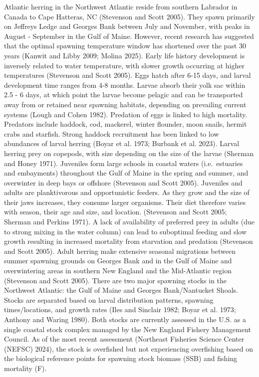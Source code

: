 \documentclass[
  letterpaper,
  DIV=11,
  numbers=noendperiod]{scrartcl}
\begin{document}
Atlantic herring in the Northwest Atlantic reside from southern Labrador
in Canada to Cape Hatteras, NC (Stevenson and Scott 2005). They spawn
primarily on Jeffreys Ledge and Georges Bank between July and November,
with peaks in August - September in the Gulf of Maine. However, recent
research has suggested that the optimal spawning temperature window has
shortened over the past 30 years (Kanwit and Libby 2009; Molina 2025).
Early life history development is inversely related to water
temperature, with slower growth occurring at higher temperatures
(Stevenson and Scott 2005). Eggs hatch after 6-15 days, and larval
development time ranges from 4-8 months. Larvae absorb their yolk sac
within 2.5 - 6 days, at which point the larvae become pelagic and can be
transported away from or retained near spawning habitats, depending on
prevailing current systems (Lough and Cohen 1982). Predation of eggs is
linked to high mortality. Predators include haddock, cod, mackerel,
winter flounder, moon snails, hermit crabs and starfish. Strong haddock
recruitment has been linked to low abundances of larval herring (Boyar
et al. 1973; Burbank et al. 2023). Larval herring prey on copepods, with
size depending on the size of the larvae (Sherman and Honey 1971).
Juveniles form large schools in coastal waters (i.e.~estuaries and
embayments) throughout the Gulf of Maine in the spring and summer, and
overwinter in deep bays or offshore (Stevenson and Scott 2005).
Juveniles and adults are planktivorous and opportunistic feeders. As
they grow and the size of their jaws increases, they consume larger
organisms. Their diet therefore varies with season, their age and size,
and location. (Stevenson and Scott 2005; Sherman and Perkins 1971). A
lack of availability of preferred prey in adults (due to strong mixing
in the water column) can lead to suboptimal feeding and slow growth
resulting in increased mortality from starvation and predation
(Stevenson and Scott 2005). Adult herring make extensive seasonal
migrations between summer spawning grounds on Georges Bank and in the
Gulf of Maine and overwintering areas in southern New England and the
Mid-Atlantic region (Stevenson and Scott 2005). There are two major
spawning stocks in the Northwest Atlantic: the Gulf of Maine and Georges
Bank/Nantucket Shoals. Stocks are separated based on larval distribution
patterns, spawning times/locations, and growth rates (Iles and Sinclair
1982; Boyar et al. 1973; Anthony and Waring 1980). Both stocks are
currently assessed in the U.S. as a single coastal stock complex managed
by the New England Fishery Management Council. As of the most recent
assessment (Northeast Fisheries Science Center (NEFSC) 2024), the stock
is overfished but not experiencing overfishing based on the biological
reference points for spawning stock biomass (SSB) and fishing mortality
(F).
\end{document}
